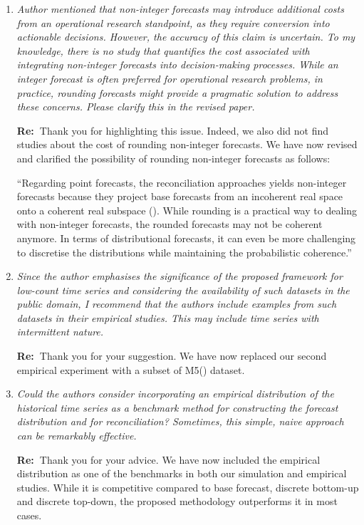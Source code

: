 \documentclass[11pt,a4paper]{article}
\newcommand{\RE}[2][Re:~]{{\color{blue}\textbf{#1}#2}}
\begin{document}
\begin{enumerate}
  \item \textit{Author mentioned that non-integer forecasts may introduce additional costs from an operational research standpoint, as they require conversion into actionable decisions. However, the accuracy of this claim is uncertain. To my knowledge, there is no study that quantifies the cost associated with integrating non-integer forecasts into decision-making processes. While an integer forecast is often preferred for operational research problems, in practice, rounding forecasts might provide a pragmatic solution to address these concerns. Please clarify this in the revised paper.}
  
  \RE{Thank you for highlighting this issue. Indeed, we also did not find studies about the cost of rounding non-integer forecasts. We have now revised and clarified the possibility of rounding non-integer forecasts as follows:
  
  ``Regarding point forecasts, the reconciliation approaches yields non-integer forecasts because they project base forecasts from an incoherent real space onto a coherent real subspace (\citealp{panagiotelisForecastReconciliationGeometric2021}).
  While rounding is a practical way to dealing with non-integer forecasts, the rounded forecasts may not be coherent anymore.
  In terms of distributional forecasts, it can even be more challenging to discretise the distributions while maintaining the probabilistic coherence.''}

  \item \textit{Since the author emphasises the significance of the proposed framework for low-count time series and considering the availability of such datasets in the public domain, I recommend that the authors include examples from such datasets in their empirical studies. This may include time series with intermittent nature.}
  
  \RE{Thank you for your suggestion. We have now replaced our second empirical experiment with a subset of M5(\citealp{makridakisM5AccuracyCompetition2022}) dataset.}

  \item \textit{Could the authors consider incorporating an empirical distribution of the historical time series as a benchmark method for constructing the forecast distribution and for reconciliation? Sometimes, this simple, naive approach can be remarkably effective.}
  
  \RE{Thank you for your advice. We have now included the empirical distribution as one of the benchmarks in both our simulation and empirical studies. While it is competitive compared to base forecast, discrete bottom-up and discrete top-down, the proposed methodology outperforms it in most cases.}
  

\end{enumerate}
\end{document}
